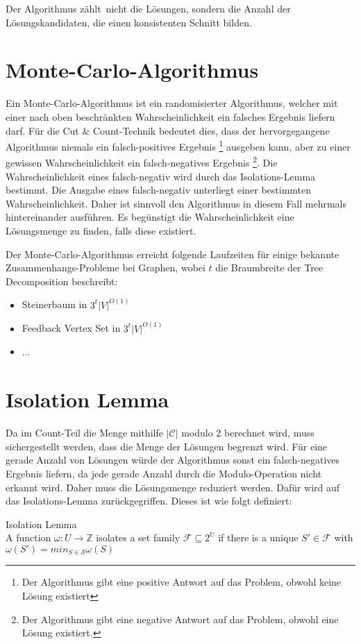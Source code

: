 Der Algorithmus \glqq zählt\grqq ~nicht die Lösungen, sondern die Anzahl der Lösungskandidaten, die einen konsistenten Schnitt bilden.

\section{Monte-Carlo-Algorithmus}
\label{sec:cc_monte}
Ein Monte-Carlo-Algorithmus ist ein randomisierter Algorithmus, welcher mit einer nach oben beschränkten Wahrscheinlichkeit ein falsches Ergebnis liefern darf. 
Für die Cut \& Count-Technik bedeutet dies, dass der hervorgegangene Algorithmus niemals ein falsch-positives Ergebnis \footnote{Der Algorithmus gibt eine positive Antwort auf das Problem, obwohl keine Lösung existiert} ausgeben kann, aber zu einer gewissen Wahrscheinlichkeit ein falsch-negatives Ergebnis \footnote{Der Algorithmus gibt eine negative Antwort auf das Problem, obwohl eine Lösung existiert.}. 
Die Wahrscheinlichkeit eines falsch-negativ wird durch das Isolations-Lemma bestimmt. 
Die Ausgabe eines falsch-negativ unterliegt einer bestimmten Wahrscheinlichkeit. Daher ist sinnvoll den Algorithmus in diesem Fall mehrmals hintereinander ausführen. Es begünstigt die Wahrscheinlichkeit eine Lösungsmenge zu finden, falls diese existiert.

Der Monte-Carlo-Algorithmus erreicht folgende Laufzeiten für einige bekannte Zusammenhangs-Probleme bei Graphen, wobei $t$ die Braumbreite der Tree Decomposition beschreibt:
\begin{itemize}
\item Steinerbaum in $3^t |V|^{O(1)}$
\item Feedback Vertex Set in $3^t|V|^{O(1)}$
\item ...
\end{itemize}

\section{Isolation Lemma}
\label{sec:cc_iso}
Da im Count-Teil die Menge mithilfe $|\mathcal{C}|$ modulo 2 berechnet wird, muss sichergestellt werden, dass die Menge der Lösungen begrenzt wird. 
Für eine gerade Anzahl von Lösungen würde der Algorithmus sonst ein falsch-negatives Ergebnis liefern, da jede gerade Anzahl durch die Modulo-Operation nicht erkannt wird. 
Daher muss die Lösungsmenge reduziert werden. Dafür wird auf das Isolations-Lemma zurückgegriffen. Dieses ist wie folgt definiert:

\begin{definition}
Isolation Lemma\\
 A function $\omega : U \rightarrow \mathbb{Z}$ isolates a set family $\mathcal{F} \subseteq 2^U$ if there is a unique $S' \in \mathcal{F}$ with $\omega (S')=min_{S \in \mathcal{S}} \omega(S)$\\
\end{definition}

